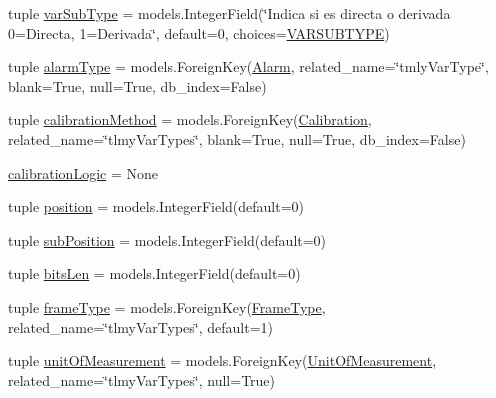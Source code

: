 \begin{DoxyCompactItemize}
\item 
tuple \hyperlink{class_ground_segment_1_1models_1_1_tlmy_var_type_1_1_tlmy_var_type_ad7c03c17c8743df66707b060faeb94a3}{var\+Sub\+Type} = models.\+Integer\+Field(\char`\"{}Indica si es directa o derivada 0=Directa, 1=Derivada\char`\"{}, default=0, choices=\hyperlink{class_ground_segment_1_1models_1_1_tlmy_var_type_1_1_tlmy_var_type_a4d07d8c0064f8f2d2edbfb5b53001d9b}{V\+A\+R\+S\+U\+B\+T\+Y\+P\+E})
\item 
tuple \hyperlink{class_ground_segment_1_1models_1_1_tlmy_var_type_1_1_tlmy_var_type_accecfd4f317d7866b48ebec1e60f5766}{alarm\+Type} = models.\+Foreign\+Key(\hyperlink{class_ground_segment_1_1models_1_1_alarm_1_1_alarm_1_1_alarm}{Alarm}, related\+\_\+name=\char`\"{}tmly\+Var\+Type\char`\"{}, blank=True, null=True, db\+\_\+index=False)
\item 
tuple \hyperlink{class_ground_segment_1_1models_1_1_tlmy_var_type_1_1_tlmy_var_type_aea6d325a3ab053c6ee06e71a6f06c7b6}{calibration\+Method} = models.\+Foreign\+Key(\hyperlink{class_ground_segment_1_1models_1_1_calibration_1_1_calibration}{Calibration}, related\+\_\+name=\char`\"{}tlmy\+Var\+Types\char`\"{}, blank=True, null=True, db\+\_\+index=False)
\item 
\hyperlink{class_ground_segment_1_1models_1_1_tlmy_var_type_1_1_tlmy_var_type_a18f6c92fda417c08ae8d76bafe2284be}{calibration\+Logic} = None
\item 
tuple \hyperlink{class_ground_segment_1_1models_1_1_tlmy_var_type_1_1_tlmy_var_type_aa3a596ef393485c1f9574fbafc151967}{position} = models.\+Integer\+Field(default=0)
\item 
tuple \hyperlink{class_ground_segment_1_1models_1_1_tlmy_var_type_1_1_tlmy_var_type_a5058fd500a0d206e5442dd8d6b5c038c}{sub\+Position} = models.\+Integer\+Field(default=0)
\item 
tuple \hyperlink{class_ground_segment_1_1models_1_1_tlmy_var_type_1_1_tlmy_var_type_a539a59fecef80aaa8d292ac5312f252a}{bits\+Len} = models.\+Integer\+Field(default=0)
\item 
tuple \hyperlink{class_ground_segment_1_1models_1_1_tlmy_var_type_1_1_tlmy_var_type_aa4241db1149485f318d75580acc3c805}{frame\+Type} = models.\+Foreign\+Key(\hyperlink{class_ground_segment_1_1models_1_1_frame_type_1_1_frame_type}{Frame\+Type}, related\+\_\+name=\char`\"{}tlmy\+Var\+Types\char`\"{}, default=1)
\item 
tuple \hyperlink{class_ground_segment_1_1models_1_1_tlmy_var_type_1_1_tlmy_var_type_aaef1f4bce93820f037c7e586170fb378}{unit\+Of\+Measurement} = models.\+Foreign\+Key(\hyperlink{class_ground_segment_1_1models_1_1_unit_of_measurement_1_1_unit_of_measurement}{Unit\+Of\+Measurement}, related\+\_\+name=\char`\"{}tlmy\+Var\+Types\char`\"{}, null=True)
\end{DoxyCompactItemize}


